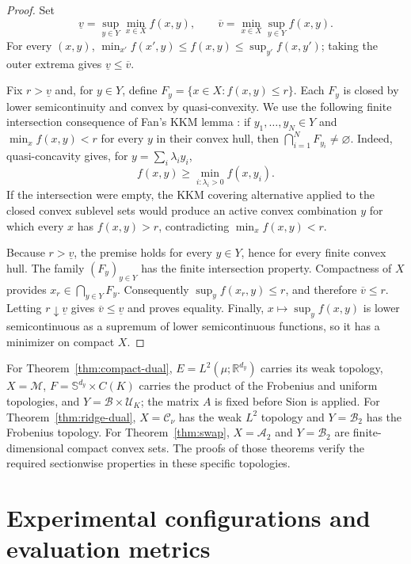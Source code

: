 \documentclass[11pt]{article}
\newcommand{\R}{\mathbb R}
\newcommand{\cU}{\mathcal U}
\newcommand{\cM}{\mathcal M}
\theoremstyle{plain}
\theoremstyle{definition}
\theoremstyle{remark}
\begin{document}
\begin{proof}
Set
\[
 \underline v=\sup_{y\in Y}\min_{x\in X}f(x,y),\qquad
 \overline v=\min_{x\in X}\sup_{y\in Y}f(x,y).
\]
For every $(x,y)$, $\min_{x'}f(x',y)\le f(x,y)\le\sup_{y'}f(x,y')$; taking the
outer extrema gives $\underline v\le\overline v$.

Fix $r>\underline v$ and, for $y\in Y$, define
$F_y=\{x\in X:f(x,y)\le r\}$.  Each $F_y$ is closed by lower semicontinuity and
convex by quasi-convexity.  We use the following finite intersection consequence of
Fan's KKM lemma \cite{FanKKM}: if $y_1,\ldots,y_N\in Y$ and
$\min_x f(x,y)<r$ for every $y$ in their convex hull, then
$\bigcap_{i=1}^NF_{y_i}\ne\varnothing$.  Indeed, quasi-concavity gives, for
$y=\sum_i\lambda_i y_i$,
\[
 f(x,y)\ge\min_{i:\lambda_i>0}f(x,y_i).
\]
If the intersection were empty, the KKM covering alternative applied to the closed
convex sublevel sets would produce an active convex combination $y$ for which every
$x$ has $f(x,y)>r$, contradicting $\min_xf(x,y)<r$.

Because $r>\underline v$, the premise holds for every $y\in Y$, hence for every
finite convex hull.  The family $(F_y)_{y\in Y}$ has the finite intersection
property.  Compactness of $X$ provides
$x_r\in\bigcap_{y\in Y}F_y$.  Consequently
$\sup_yf(x_r,y)\le r$, and therefore $\overline v\le r$.  Letting
$r\downarrow\underline v$ gives $\overline v\le\underline v$ and proves equality.
Finally, $x\mapsto\sup_yf(x,y)$ is lower semicontinuous as a supremum of
lower semicontinuous functions, so it has a minimizer on compact $X$.
\end{proof}

For Theorem~\ref{thm:compact-dual}, $E=L^2(\mu;\R^{d_y})$ carries its weak topology,
$X=\cM$, $F=\mathbb S^{d_y}\times C(K)$ carries the product of the Frobenius and
uniform topologies, and $Y=\mathcal B\times\cU_K$; the matrix $A$ is fixed before
Sion is applied. For Theorem~\ref{thm:ridge-dual}, $X=\mathcal C_\nu$ has the weak
$L^2$ topology and $Y=\mathcal B_2$ has the Frobenius topology. For
Theorem~\ref{thm:swap}, $X=\mathcal A_2$ and $Y=\mathcal B_2$ are finite-dimensional
compact convex sets. The proofs of those theorems verify the required sectionwise
properties in these specific topologies.

\section{Experimental configurations and evaluation metrics}
\label{app:experimental-configurations}
\end{document}
